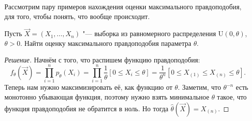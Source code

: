 Рассмотрим пару примеров нахождения оценки максимального правдоподобия, для того, чтобы понять, что вообще происходит.
\begin{problem}
    Пусть $\vec{X} = (X_{1}, \ldots, X_{n})$ "--- выборка из равномерного распределения $\mathrm{U}(0, \theta)$, $\theta > 0$. Найти оценку максимального правдоподобия параметра $\theta$.
\end{problem}
\begin{proof}[Решение]
    Начнём с того, что распишем функцию правдоподобия:
    \[
        f_{\theta}(\vec{X}) = \prod_{i = 1}^{n} p_{\theta}(X_{i}) = \prod_{i = 1}^{n} \frac{1}{\theta}[0 \leq X_{i} \leq \theta] = \frac{1}{\theta^{n}}[0 \leq X_{(1)} \leq X_{(n)} \leq \theta].
    \]
    Теперь нам нужно максимизировать её, как функцию от $\theta$. Заметим, что $\theta^{-n}$ есть монотонно убывающая функция, поэтому нужно взять минимальное $\theta$ такое, что функция правдоподобия не обратится в ноль. Но тогда $\hat{\theta}(\vec{X}) = X_{(n)}$.
\end{proof}

